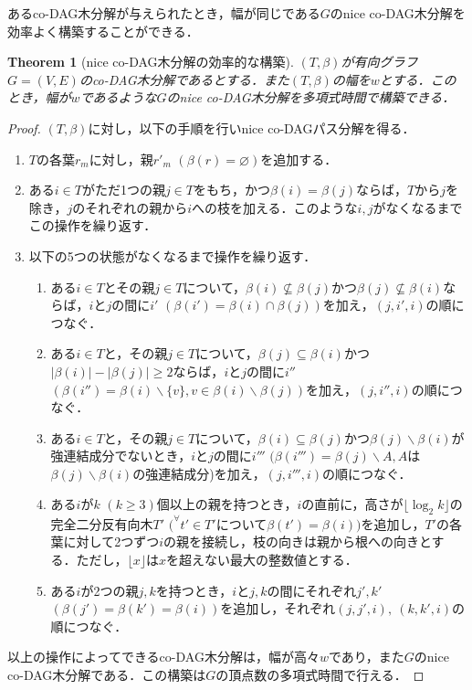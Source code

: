 \documentclass[master]{kuisthesis}		%
\theoremstyle{plain}
\newtheorem{theorem}{Theorem}
\theoremstyle{definition}
\begin{document}
あるco-DAG木分解が与えられたとき，幅が同じである$G$のnice co-DAG木分解を効率よく構築することができる．

\begin{theorem}[nice co-DAG木分解の効率的な構築]
    $(T, \beta)$が有向グラフ$G=(V, E)$のco-DAG木分解であるとする．また$(T, \beta)$の幅を$w$とする．このとき，幅が$w$であるような$G$のnice co-DAG木分解を多項式時間で構築できる．
\end{theorem}

\begin{proof}
    $(T, \beta)$に対し，以下の手順を行いnice co-DAGパス分解を得る．

    \begin{enumerate}
        \item $T$の各葉$r_m$に対し，親$r'_m$ $(\beta(r) = \varnothing)$を追加する．
        \item ある$i \in T$がただ1つの親$j \in T$をもち，かつ$\beta(i) = \beta(j)$ならば，$T$から$j$を除き，$j$のそれぞれの親から$i$への枝を加える．このような$i, j$がなくなるまでこの操作を繰り返す．
        \item 以下の5つの状態がなくなるまで操作を繰り返す．
        \begin{enumerate}
            \item ある$i \in T$とその親$j \in T$について，$\beta(i) \nsubseteq \beta(j)$かつ$\beta(j) \nsubseteq \beta(i)$ならば，$i$と$j$の間に$i'$ $(\beta(i') = \beta(i) \cap \beta(j))$を加え，$(j, i', i)$の順につなぐ．
            \item ある$i \in T$と，その親$j \in T$について，$\beta(j) \subseteq \beta(i)$かつ$|\beta(i)| - |\beta(j)| \geq 2$ならば，$i$と$j$の間に$i''$ $(\beta(i'') = \beta(i) \backslash \{v\}, v \in \beta(i) \backslash \beta(j))$を加え，$(j, i'', i)$の順につなぐ．
            \item ある$i \in T$と，その親$j \in T$について，$\beta(i) \subseteq \beta(j)$かつ$\beta(j) \backslash \beta(i)$が強連結成分でないとき，$i$と$j$の間に$i'''$ $(\beta(i''') = \beta(j) \backslash A, A$は$\beta(j) \backslash \beta(i)$の強連結成分)を加え，$(j, i''', i)$の順につなぐ．
            \item ある$i$が$k$ $(k \geq 3)$個以上の親を持つとき，$i$の直前に，高さが$\lfloor \log_{2} k \rfloor$の完全二分反有向木$T'$ $(^{\forall}t' \in T'$について$\beta(t') = \beta(i))$を追加し，$T'$の各葉に対して2つずつ$i$の親を接続し，枝の向きは親から根への向きとする．ただし，$\lfloor x \rfloor$は$x$を超えない最大の整数値とする．
            \item ある$i$が2つの親$j, k$を持つとき，$i$と$j, k$の間にそれぞれ$j', k'$ $(\beta(j') = \beta(k') = \beta(i))$を追加し，それぞれ$(j, j', i),\ (k, k', i)$の順につなぐ．
        \end{enumerate}
    \end{enumerate}
    以上の操作によってできるco-DAG木分解は，幅が高々$w$であり，また$G$のnice co-DAG木分解である．この構築は$G$の頂点数の多項式時間で行える．
\end{proof}
\end{document}
